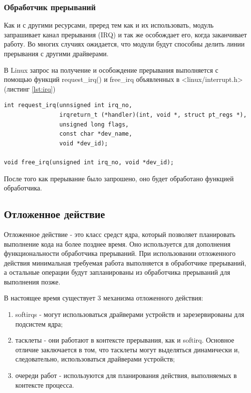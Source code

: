 \subsubsection{Обработчик прерываний}
Как и с другими ресурсами, преред тем как и их использовать, модуль запрашивает канал прерывания (IRQ) и так же особождает его, когда заканчивает работу.
Во многих случиях ожидается, что модули будут способны делить линии прерывания с другими драйверами.

В Linux запрос на получение и особождение прерывания выполняется с помощью функций request\_irq() и free\_irq объявленных в <linux/interrupt.h> (листинг \ref{lst:irq})
\begin{lstlisting}[caption={Функция request\_irq() и free\_irq()}, label={lst:irq}]
int request_irq(unnsigned int irq_no,
				irqreturn_t (*handler)(int, void *, struct pt_regs *),
				unsigned long flags,
				const char *dev_name,
				void *dev_id);

void free_irq(unsigned int irq_no, void *dev_id);
\end{lstlisting}

После того как прерывание было запрошено, оно будет обработано функцией обработчика.

\subsection{Отложенное действие}
Отложенное действие - это класс средст ядра, который позволяет планировать выполнение кода на более позднее время.
Оно используется для дополнения функциональности обработчика прерываний.
При использовании отложенного действия минимальная требуемая работа выполняется в обработчике прерываний, а остальные операции будут запланированы из обработчика прерываний для выполнения позже. 

В настоящее время существует 3 механизма отложенного действия:
\begin{enumerate}
	\item softirqs - могут использоваться драйверами устройств и зарезервированы для подсистем ядра;
	\item тасклеты - они работают в контексте прерывания, как и softirq.
	Основное отличие заключается в том, что тасклеты могут выделяться динамически и, следовательно, использоваться драйверами устройств;
	\item очереди работ - используются для планирования действия, выполняемых в контексте процесса.
\end{enumerate}

